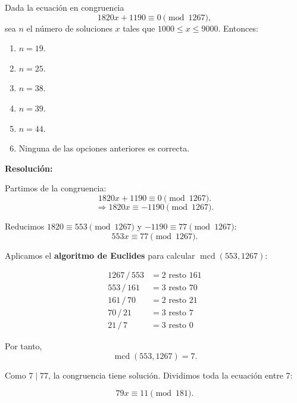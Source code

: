 \documentclass[a4paper,12pt]{article}
\begin{document}
\begin{ejercicioExamen}[title=Ejercicio 3]
Dada la ecuación en congruencia 
\[
1820x + 1190 \equiv 0 \pmod{1267},
\]
sea \( n \) el número de soluciones \( x \) tales que \( 1000 \le x \le 9000 \). Entonces:

\begin{enumerate}
\item[$a)$] \( n = 19. \)
\item[$b)$] \( n = 25. \)
\item[$c)$] \( n = 38. \)
\item[$d)$] \( n = 39. \)
\item[$e)$] \( n = 44. \)
\item[$f)$] Ninguna de las opciones anteriores es correcta.
\end{enumerate}

\tcblower
\textbf{Resolución:}

Partimos de la congruencia:
\[
1820x + 1190 \equiv 0 \pmod{1267}.
\]
\[
\Rightarrow 1820x \equiv -1190 \pmod{1267}.
\]

Reducimos \(1820 \equiv 553 \pmod{1267}\) y \(-1190 \equiv 77 \pmod{1267}\):
\[
553x \equiv 77 \pmod{1267}.
\]

\medskip
Aplicamos el \textbf{algoritmo de Euclides} para calcular \(\operatorname{mcd}(553,1267)\):

\[
\begin{aligned}
    1267\,/\,553 &= 2 \text{ resto } 161 \\
    553\,/\,161 &= 3 \text{ resto } 70 \\
    161\,/\,70 &= 2 \text{ resto } 21 \\
    70\,/\,21 &= 3 \text{ resto } \boxed{7} \\
    21\,/\,7 &= 3 \text{ resto } 0
\end{aligned}
\]

Por tanto,
\[
\operatorname{mcd}(553,1267) = \boxed{7}.
\]

\medskip
Como \(7 \mid 77\), la congruencia tiene solución. Dividimos toda la ecuación entre 7:

\[
79x \equiv 11 \pmod{181}.
\]

\end{ejercicioExamen}
\end{document}
